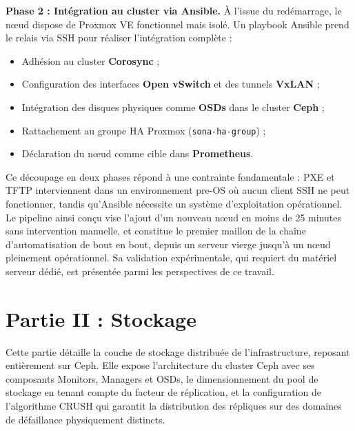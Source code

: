 \par \textbf{Phase 2 : Intégration au cluster via Ansible.} À l'issue du redémarrage, le nœud dispose de Proxmox VE fonctionnel mais isolé. Un playbook Ansible prend le relais via SSH pour réaliser l'intégration complète :\\

\begin{itemize}
    \item Adhésion au cluster \textbf{Corosync} ;
    \item Configuration des interfaces \textbf{Open vSwitch} et des tunnels \textbf{VxLAN} ;
    \item Intégration des disques physiques comme \textbf{OSDs} dans le cluster \textbf{Ceph} ;
    \item Rattachement au groupe HA Proxmox (\texttt{sona-ha-group}) ;
    \item Déclaration du nœud comme cible dans \textbf{Prometheus}.
\end{itemize}

\par Ce découpage en deux phases répond à une contrainte fondamentale : PXE et TFTP interviennent dans un environnement pre-OS où aucun client SSH ne peut fonctionner, tandis qu'Ansible nécessite un système d'exploitation opérationnel. Le pipeline ainsi conçu vise l'ajout d'un nouveau nœud en moins de 25 minutes sans intervention manuelle, et constitue le premier maillon de la chaîne d'automatisation de bout en bout, depuis un serveur vierge jusqu'à un nœud pleinement opérationnel. Sa validation expérimentale, qui requiert du matériel serveur dédié, est présentée parmi les perspectives de ce travail.\\

\section{Partie II : Stockage}

\par Cette partie détaille la couche de stockage distribuée de l'infrastructure, reposant entièrement sur Ceph. Elle expose l'architecture du cluster Ceph avec ses composants Monitors, Managers et OSDs, le dimensionnement du pool de stockage en tenant compte du facteur de réplication, et la configuration de l'algorithme CRUSH qui garantit la distribution des répliques sur des domaines de défaillance physiquement distincts.\\

